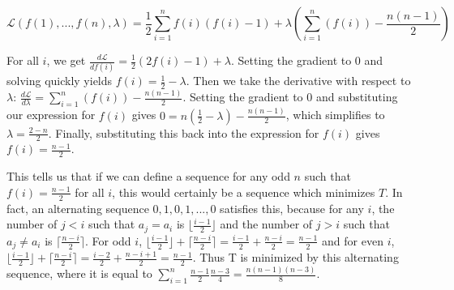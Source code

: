 \begin{enumerate}
 
 \[\mathcal{L} (f(1),...,f(n), \lambda) = \frac{1}{2}\sum_{i=1}^n f(i)(f(i)-1) + \lambda\left(\sum_{i=1}^n(f(i))-\frac{n(n-1)}{2}\right)\]

 For all $i$, we get $\frac{d\mathcal{L}}{df(i)} = \frac{1}{2}(2f(i)-1) + \lambda$. Setting the gradient to 0 and solving quickly yields $f(i) = \frac{1}{2}-\lambda$. Then we take the derivative with respect to $\lambda$: $\frac{d\mathcal{L}}{d\lambda} = \sum_{i=1}^n (f(i)) - \frac{n(n-1)}{2}$. Setting the gradient to 0 and substituting our expression for $f(i)$ gives $0 = n(\frac{1}{2}-\lambda) - \frac{n(n-1)}{2}$, which simplifies to $\lambda = \frac{2-n}{2}$. Finally, substituting this back into the expression for $f(i)$ gives $f(i) = \frac{n-1}{2}$. 

 
This tells us that if we can define a sequence for any odd $n$ such that $f(i) = \frac{n-1}{2}$ for all $i$, this would certainly be a sequence which minimizes $T$. In fact, an alternating sequence $0,1,0,1,...,0$ satisfies this, because for any $i$, the number of $j<i$ such that $a_j = a_i$ is $\lfloor \frac{i-1}{2} \rfloor$ and the number of $j>i$  such that $a_j \neq a_i$ is $\lceil \frac{n-i}{2} \rceil$. For odd $i$, $\lfloor \frac{i-1}{2} \rfloor + \lceil \frac{n-i}{2} \rceil = \frac{i-1}{2} + \frac{n-i}{2} = \frac{n-1}{2}$ and for even $i$, $\lfloor \frac{i-1}{2} \rfloor + \lceil \frac{n-i}{2} \rceil = \frac{i-2}{2} + \frac{n-i+1}{2} = \frac{n-1}{2}$. Thus T is minimized by this alternating sequence, where it is equal to $\sum_{i=1}^n \frac{n-1}{2} \frac{n-3}{4} = \frac{n(n-1)(n-3)}{8}$.

 


 


\end{enumerate}